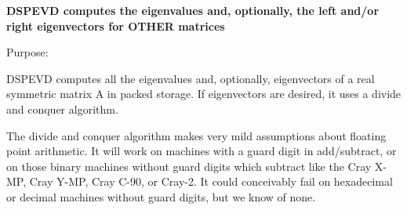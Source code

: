 {\bfseries  D\+S\+P\+E\+V\+D computes the eigenvalues and, optionally, the left and/or right eigenvectors for O\+T\+H\+E\+R matrices} 

 \begin{DoxyParagraph}{Purpose\+: }
\begin{DoxyVerb} DSPEVD computes all the eigenvalues and, optionally, eigenvectors
 of a real symmetric matrix A in packed storage. If eigenvectors are
 desired, it uses a divide and conquer algorithm.

 The divide and conquer algorithm makes very mild assumptions about
 floating point arithmetic. It will work on machines with a guard
 digit in add/subtract, or on those binary machines without guard
 digits which subtract like the Cray X-MP, Cray Y-MP, Cray C-90, or
 Cray-2. It could conceivably fail on hexadecimal or decimal machines
 without guard digits, but we know of none.\end{DoxyVerb}
 
\end{DoxyParagraph}

